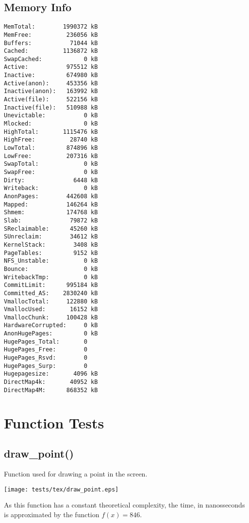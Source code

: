 \documentclass{article}
\begin{document}
\subsection{Memory Info}
\begin{verbatim}
MemTotal:        1990372 kB
MemFree:          236056 kB
Buffers:           71044 kB
Cached:          1136872 kB
SwapCached:            0 kB
Active:           975512 kB
Inactive:         674980 kB
Active(anon):     453356 kB
Inactive(anon):   163992 kB
Active(file):     522156 kB
Inactive(file):   510988 kB
Unevictable:           0 kB
Mlocked:               0 kB
HighTotal:       1115476 kB
HighFree:          28740 kB
LowTotal:         874896 kB
LowFree:          207316 kB
SwapTotal:             0 kB
SwapFree:              0 kB
Dirty:              6448 kB
Writeback:             0 kB
AnonPages:        442608 kB
Mapped:           146264 kB
Shmem:            174768 kB
Slab:              79872 kB
SReclaimable:      45260 kB
SUnreclaim:        34612 kB
KernelStack:        3408 kB
PageTables:         9152 kB
NFS_Unstable:          0 kB
Bounce:                0 kB
WritebackTmp:          0 kB
CommitLimit:      995184 kB
Committed_AS:    2830240 kB
VmallocTotal:     122880 kB
VmallocUsed:       16152 kB
VmallocChunk:     100428 kB
HardwareCorrupted:     0 kB
AnonHugePages:         0 kB
HugePages_Total:       0
HugePages_Free:        0
HugePages_Rsvd:        0
HugePages_Surp:        0
Hugepagesize:       4096 kB
DirectMap4k:       40952 kB
DirectMap4M:      868352 kB
\end{verbatim}
\section{Function Tests}
\subsection{draw\_point()}
Function used for drawing a point in the screen.


\texttt{[image: tests/tex/draw\_point.eps]}

As this function has a constant theoretical
complexity, the time, in nanosseconds is 
approximated by the function $f(x)=846$.
\end{document}
